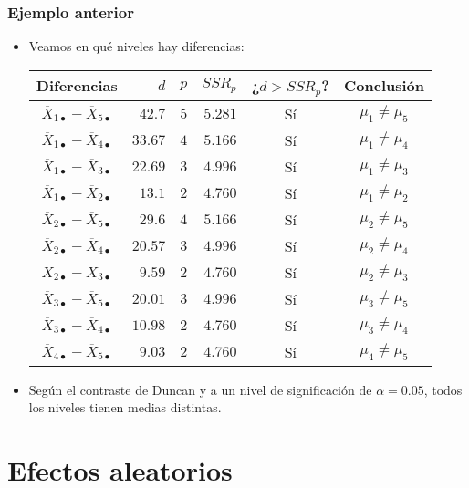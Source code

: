 \begin{frame}
\frametitle{Ejemplo anterior}
\begin{itemize}
\item<2-> Veamos en qué niveles hay diferencias:
{\small\begin{center}
\begin{tabular}{|c|r|r|r@{}|@{}c|c@{}|}
\hline
Diferencias&$d$&$p$&$SSR_p$&¿$d > SSR_p$?&Conclusión\\\hline
$\overline{X}_{1\bullet}-\overline{X}_{5\bullet}$&$42.7$&$5$&$5.281$&Sí&$\mu_1 \not=\mu_5$\\
$\overline{X}_{1\bullet}-\overline{X}_{4\bullet}$&$33.67$&$4$&$5.166$&Sí&$\mu_1 \not=\mu_4$\\
$\overline{X}_{1\bullet}-\overline{X}_{3\bullet}$&$22.69$&$3$&$4.996$&Sí&$\mu_1 \not=\mu_3$\\
$\overline{X}_{1\bullet}-\overline{X}_{2\bullet}$&$13.1$&$2$&$4.760$&Sí&$\mu_1 \not=\mu_2$\\
$\overline{X}_{2\bullet}-\overline{X}_{5\bullet}$&$29.6$&$4$&$5.166$&Sí&$\mu_2 \not=\mu_5$\\
$\overline{X}_{2\bullet}-\overline{X}_{4\bullet}$&$20.57$&$3$&$4.996$&Sí&$\mu_2 \not=\mu_4$\\
$\overline{X}_{2\bullet}-\overline{X}_{3\bullet}$&$9.59$&$2$&$4.760$&Sí&$\mu_2 \not=\mu_3$\\
$\overline{X}_{3\bullet}-\overline{X}_{5\bullet}$&$20.01$&$3$&$4.996$&Sí&$\mu_3 \not=\mu_5$\\
$\overline{X}_{3\bullet}-\overline{X}_{4\bullet}$&$10.98$&$2$&$4.760$&Sí&$\mu_3 \not=\mu_4$\\
$\overline{X}_{4\bullet}-\overline{X}_{5\bullet}$&$9.03$&$2$&$4.760$&Sí&$\mu_4 \not=\mu_5$\\\hline
\end{tabular}
\end{center}}
\item<3-> Según el contraste de Duncan y a un nivel de significación de $\alpha =0.05$, todos los niveles tienen medias distintas.
\end{itemize}
\end{frame}
\section{Efectos aleatorios}


